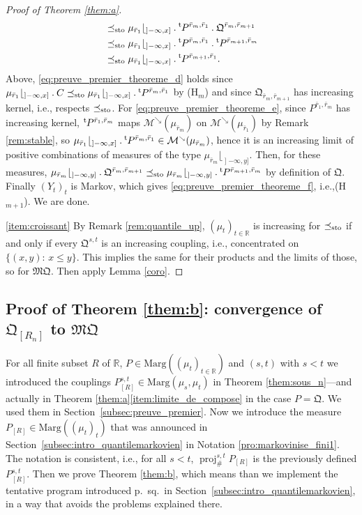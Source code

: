 \documentclass[11pt]{article}
\newcommand{\ie}{i.e.,\xspace}
\newcommand{\ldot}{\mathbin{.}}
\theoremstyle{plain}
\theoremstyle{definition}
\newcommand{\como}{\mathfrak{Q}}
\newcommand{\mq}{\mathfrak{MQ}}
\let\mb\relax
\let\mn\relax
\newcommand{\trans}{{}^{\mathrm{t}}\mkern-1mu}
\newcommand{\ma}{\mathrm{Marg}}
\newcommand{\R}{\mathbb{R}}
\newcommand{\leqs}{\preceq_{\text{\rm sto}}}
\newcommand{\pr}{\operatorname{proj}}
\newcommand{\mdec}{\mathcal{M}^{\scriptscriptstyle\searrow}}
\newcommand{\op}{\mathopen}
\begin{document}
\begin{proof}[Proof of Theorem \ref{them:a}]
\begin{align}
&\leqs\mu_{\bar r_1}\lfloor_{\op]-\infty,x]}{}\ldot\trans P^{\bar r_m,\bar r_1}{}\ldot\como^{\bar r_{m},\bar r_{m+1}}\label{eq:preuve_premier_theoreme_d}\\
&\leqs \mu_{\bar r_1}\lfloor_{\op]-\infty,x]}{}\ldot\trans P^{\bar r_m,\bar r_1}{}\ldot\trans P^{\bar r_{m+1},\bar r_m}\label{eq:preuve_premier_theoreme_e}\\
&\leqs \mu_{\bar r_1}\lfloor_{\op]-\infty,x]}{}\ldot\trans P^{\bar r_{m+1},\bar r_1}\label{eq:preuve_premier_theoreme_f}.
\end{align}
Above, \eqref{eq:preuve_premier_theoreme_d} holds since $\mu_{\bar r_1}\lfloor_{\op]-\infty,x]}{}\ldot C\leqs\mu_{\bar r_1}\lfloor_{\op]-\infty,x]}{}\ldot\trans P^{\bar r_m,\bar r_1}$ by (H$_m$) and since $\como_{\bar r_{m},\bar r_{m+1}}$ has increasing kernel, \ie respects $\leqs$. For \eqref{eq:preuve_premier_theoreme_e}, since $P^{\bar r_1,\bar r_m}$ has increasing kernel, $\trans P^{\bar r_1,\bar r_m}$ maps $\mdec(\mu_{\bar r_m})$ on $\mdec(\mu_{\bar r_1})$ by Remark \ref{rem:stable}, so $\mu_{\bar r_1}\lfloor_{\op]-\infty,x]}{}\ldot\trans P^{\bar r_m,\bar r_1}\in\mdec(\mu_{\bar r_m})$, hence it is an increasing limit of positive combinations of measures of the type $\mu_{\bar r_m}\lfloor_{\op]-\infty,y]}$. Then, for these measures, $\mu_{\bar r_m}\lfloor_{\op]-\infty,y]}{}\ldot\como^{\bar r_m,\bar r_{m+1}}\leqs\mu_{\bar r_m}\lfloor_{\op]-\infty,y]}{}\ldot\trans P^{\bar r_{m+1},\bar r_m}$ by definition of $\como$. Finally $(Y_t)_t$ is Markov, which gives \eqref{eq:preuve_premier_theoreme_f}, \ie (H$_{m+1}$). We are done. 

\eqref{item:croissant}
By Remark \ref{rem:quantile_up}, $(\mu_t)_{t\in\R}$ is increasing for $\leqs$ if and only if every $\como^{s,t}$ is an increasing coupling, \ie concentrated on $\{(x,y):\,x\leqslant y\}$. This implies the same for their products and the limits of those, so for $\mq$. Then apply Lemma \ref{coro}.
\end{proof}

\subsection{Proof of Theorem \ref{them:b}: convergence of \mb$\como_{[R_n]}$ to $\mq$\mn}\label{subsec:preuve_deuxieme} For all finite subset $R$ of $\R$, $P\in\ma((\mu_t)_{t\in\R})$ and $(s,t)$ with $s<t$ we introduced the couplings $P_{[R]}^{s,t}\in\ma(\mu_s,\mu_t)$ in Theorem \ref{them:sous_n}---and actually in Theorem \ref{them:a}\eqref{item:limite_de_compose} in the case $P=\como$. We used them in Section~\ref{subsec:preuve_premier}. Now we introduce the measure $P_{[R]}\in\ma((\mu_t)_{t})$ that was announced in Section~\ref{subsec:intro_quantilemarkovien} in Notation \ref{pro:markovinise_fini1}. The notation is consistent, \ie for all $s<t$, $\pr^{s,t}_\#P_{[R]}$ is the previously defined $P_{[R]}^{s,t}$. Then we prove Theorem \ref{them:b}, which means than we implement the tentative program introduced p.\,\pageref{page:tentative_limite} sq.\ in Section~\ref{subsec:intro_quantilemarkovien}, in a way that avoids the problems explained there.
\end{document}
